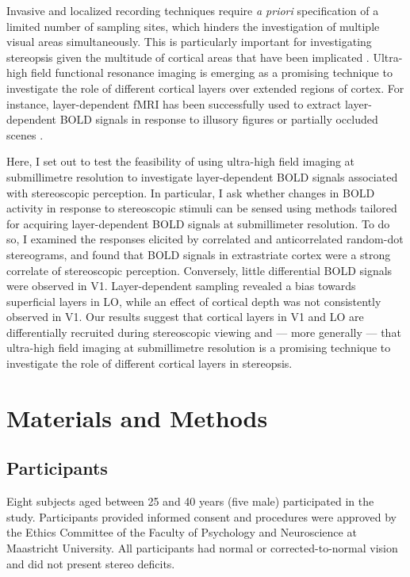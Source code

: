 Invasive and localized recording techniques require \textit{a priori} specification of a limited number of sampling sites, which hinders the investigation of multiple visual areas simultaneously. This is particularly important for investigating stereopsis given the multitude of cortical areas that have been implicated \cite{Preston:2008dg}. Ultra-high field functional resonance imaging is emerging as a promising technique to investigate the role of different cortical layers over extended regions of cortex. For instance, layer-dependent fMRI has been successfully used to extract layer-dependent BOLD signals in response to illusory figures \cite{Kok:2016fk} or partially occluded scenes \cite{Muckli:2015wb}.

Here, I set out to test the feasibility of using ultra-high field imaging at submillimetre resolution to investigate layer-dependent BOLD signals associated with stereoscopic perception. In particular, I ask whether changes in BOLD activity in response to stereoscopic stimuli can be sensed using methods tailored for acquiring layer-dependent BOLD signals at submillimeter resolution. To do so, I examined the responses elicited by correlated and anticorrelated random-dot stereograms, and found that BOLD signals in extrastriate cortex were a strong correlate of stereoscopic perception. Conversely, little differential BOLD signals were observed in V1. Layer-dependent sampling revealed a bias towards superficial layers in LO, while an effect of cortical depth was not consistently observed in V1. Our results suggest that cortical layers in V1 and LO are differentially recruited during stereoscopic viewing and --- more generally --- that ultra-high field imaging at submillimetre resolution is a promising technique to investigate the role of different cortical layers in stereopsis.


\section{Materials and Methods}

\subsection{Participants}
Eight subjects aged between 25 and 40 years (five male) participated in the study. Participants provided informed consent and procedures were approved by the Ethics Committee of the Faculty of Psychology and Neuroscience at Maastricht University. All participants had normal or corrected-to-normal vision and did not present stereo deficits.


